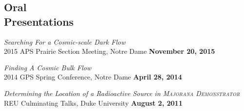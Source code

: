 \documentclass[margin]{res}
\begin{document}
\begin{resume}
\section{Oral \\Presentations}
{\sl Searching For a Cosmic-scale Dark Flow} \\
2015 APS Prairie Section Meeting, Notre Dame \hfill {\bf November 20, 2015}

{\sl Finding A Cosmic Bulk Flow} \\
2014 GPS Spring Conference, Notre Dame \hfill {\bf April 28, 2014}

{\sl Determining the Location of a Radioactive Source in \textsc{Majorana Demonstrator}} \\
REU Culminating Talks,
Duke University \hfill {\bf August 2, 2011} 








\end{resume}
\end{document}
